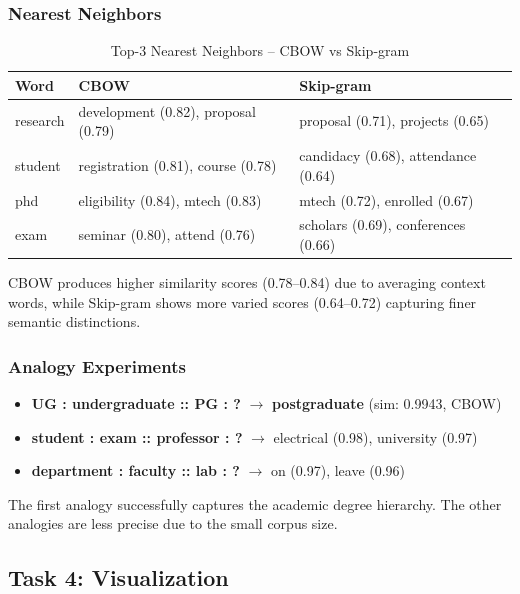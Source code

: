 \documentclass[11pt,a4paper]{article}
\begin{document}
\subsubsection{Nearest Neighbors}

\begin{table}[H]
\centering
\caption{Top-3 Nearest Neighbors -- CBOW vs Skip-gram}
\small
\begin{tabular}{lll}
\toprule
\textbf{Word} & \textbf{CBOW} & \textbf{Skip-gram} \\
\midrule
research & development (0.82), proposal (0.79) & proposal (0.71), projects (0.65) \\
student  & registration (0.81), course (0.78) & candidacy (0.68), attendance (0.64) \\
phd      & eligibility (0.84), mtech (0.83) & mtech (0.72), enrolled (0.67) \\
exam     & seminar (0.80), attend (0.76) & scholars (0.69), conferences (0.66) \\
\bottomrule
\end{tabular}
\end{table}

\noindent CBOW produces higher similarity scores (0.78--0.84) due to averaging context words, while Skip-gram shows more varied scores (0.64--0.72) capturing finer semantic distinctions.

\subsubsection{Analogy Experiments}

\begin{itemize}[noitemsep]
    \item \textbf{UG : undergraduate :: PG : ?} $\rightarrow$ \textbf{postgraduate} (sim: 0.9943, CBOW)
    \item \textbf{student : exam :: professor : ?} $\rightarrow$ electrical (0.98), university (0.97)
    \item \textbf{department : faculty :: lab : ?} $\rightarrow$ on (0.97), leave (0.96)
\end{itemize}

The first analogy successfully captures the academic degree hierarchy. The other analogies are less precise due to the small corpus size.

\subsection{Task 4: Visualization}
\end{document}
